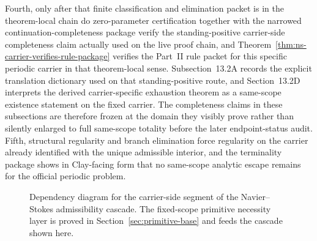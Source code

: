 Fourth, only after that finite classification and elimination packet is in the theorem-local chain do zero-parameter certification together with the narrowed continuation-completeness package verify the standing-positive carrier-side completeness claim actually used on the live proof chain, and Theorem~\ref{thm:ns-carrier-verifies-rule-package} verifies the Part~II rule packet for this specific periodic carrier in that theorem-local sense. Subsection~13.2A records the explicit translation dictionary used on that standing-positive route, and Section~13.2D interprets the derived carrier-specific exhaustion theorem as a same-scope existence statement on the fixed carrier. The completeness claims in these subsections are therefore frozen at the domain they visibly prove rather than silently enlarged to full same-scope totality before the later endpoint-status audit.
Fifth, structural regularity and branch elimination force regularity on the carrier already identified with the unique admissible interior, and the terminality package shows in Clay-facing form that no same-scope analytic escape remains for the official periodic problem.

\begin{figure}[p]
\centering
{}
\caption{Dependency diagram for the carrier-side segment of the Navier--Stokes admissibility cascade. The fixed-scope primitive necessity layer is proved in Section~\ref{sec:primitive-base} and feeds the cascade shown here.}
\end{figure}

